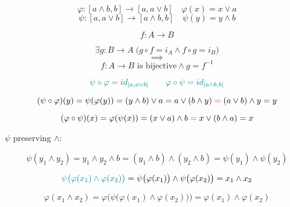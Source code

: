 \begin{frame}{}
\end{frame}

\begin{frame}{}
  \[
    \varphi: [a \land b, b] \to [a, a \lor b]  \quad \varphi(x) = x \lor a
  \]
  \[
    \psi: [a, a \lor b] \to [a \land b, b] \quad \psi(y) = y \land b
  \]

  \vspace{0.30cm}
  \centerline{}

  \pause
  \vspace{0.40cm}
\end{frame}

\begin{frame}{}
  \begin{theorem}
    \[
      f: A \to B
    \]

    \[
      \exists g: B \to A\; \Big( g \circ f = i_A \land f \circ g = i_B \Big) 
    \]
    \[ 
      \implies 
    \]
    \[
      f: A \to B \text{ is bijective} \land g = f^{-1}
    \]
  \end{theorem}
\end{frame}

\begin{frame}{}
  \[
    \textcolor{teal}{\psi \circ \varphi = id_{[a, a \lor b]} \qquad \varphi \circ \psi = id_{[a \land b, b]}}
  \]

  \pause
  \[
    (\psi \circ \varphi) (y) = \psi(\varphi(y)) = (y \land b) \lor a = a \lor (b \land y) \textcolor{red}{\;=\;} (a \lor b) \land y = y
  \]

  \pause
  \[
    (\varphi \circ \psi) (x) = \varphi(\psi(x)) = (x \lor a) \land b \textcolor{red}{\;=\;} x \lor (b \land a) = x
  \]
\end{frame}

\begin{frame}{}
  \centerline{}

  \pause
  \vspace{0.50cm}
  \centerline{$\psi$ preserving $\land$:}
  \[
    \psi(y_1 \land y_2) = y_1 \land y_2 \land b = (y_1 \land b) \land (y_2 \land b) = \psi(y_1) \land \psi(y_2)
  \]

  \pause
  \vspace{0.20cm}
  \[
    \textcolor{teal}{\psi\big(\varphi(x_1) \land \varphi(x_2) \big)} = \psi\big(\varphi(x_1)\big) \land \psi\big(\varphi(x_2)\big) = x_1 \land x_2
  \]

  \pause
  \[
    \varphi(x_1 \land x_2) = \varphi\Big(\psi\big(\varphi(x_1) \land \varphi(x_2) \big)\Big) = \varphi(x_1) \land \varphi(x_2)
  \]
\end{frame}

% 
% 
